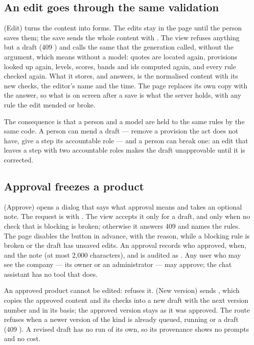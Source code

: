\subsection{An edit goes through the same validation}

 (Edit) turns the content into forms. The edits stay in the page until the
person saves them; the save sends the whole content with
. The view  refuses anything
but a draft (409 ) and calls the same  that the generation
called, without the  argument, which means without a model: quotes are located
again, provisions looked up again, levels, scores, bands and ids computed again, and every
rule checked again. What it stores, and answers, is the normalised content with its new
checks, the editor's name and the time. The page replaces its own copy with the answer, so
what is on screen after a save is what the server holds, with any rule the edit mended or
broke.

The consequence is that a person and a model are held to the same rules by the same code. A
person can mend a draft --- remove a provision the act does not have, give a step its
accountable role --- and a person can break one: an edit that leaves a step with two
accountable roles makes the draft unapprovable until it is corrected.

\subsection{Approval freezes a product}

 (Approve) opens a dialog that says what approval means and takes an optional
note. The request is
 with . The view 
accepts it only for a draft, and only when no check that is blocking is broken; otherwise it
answers 409  and names the rules. The page disables the button in
advance, with the reason, while a blocking rule is broken or the draft has unsaved edits. An
approval records who approved, when, and the note (at most 2,000 characters), and is audited
as . Any user who may see the company --- its owner or an
administrator --- may approve; the chat assistant has no tool that does.

An approved product cannot be edited:  refuses it.  (New version)
sends , which copies the approved content and its
checks into a new draft with the next version number and  in its basis; the
approved version stays as it was approved. The route refuses when a newer version of the kind
is already queued, running or a draft (409 ). A revised draft has no run
of its own, so its provenance shows no prompts and no cost.

